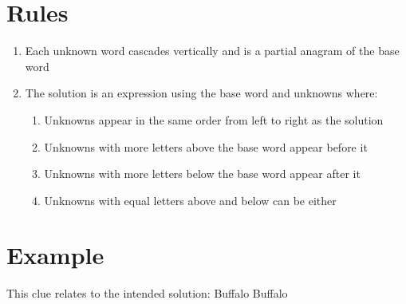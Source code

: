 \documentclass[letterpaper]{article}
\begin{document}
\section*{Rules}

\begin{enumerate}
    \item Each unknown word cascades vertically and is a partial anagram of the base word
    \item The solution is an expression using the base word and unknowns where:
    \begin{enumerate}
        \item Unknowns appear in the same order from left to right as the solution
        \item Unknowns with more letters above the base word appear before it
        \item Unknowns with more letters below the base word appear after it
        \item Unknowns with equal letters above and below can be either
    \end{enumerate}
\end{enumerate}

\vspace*{1em}
\section*{Example}

This clue relates to the intended solution: Buffalo Buffalo
\end{document}
